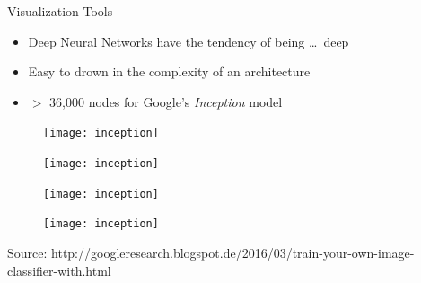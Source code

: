 \begin{slide}{Visualization Tools}
  \begin{itemize}
    \item<2-> Deep Neural Networks have the tendency of being \dots\, deep
    \item<3-> Easy to drown in the complexity of an architecture
    \item<4-> $>$ 36,000 nodes for Google's \emph{Inception} model
  \end{itemize}
\end{slide}

\begin{frame}
  \begin{figure}
     \advance\leftskip-2.2cm
    \texttt{[image: inception]}
  \end{figure}
\end{frame}

\begin{frame}
  \begin{figure}
    \advance\leftskip-2.2cm
    \texttt{[image: inception]}
  \end{figure}
\end{frame}

\begin{frame}
  \begin{figure}
    \advance\leftskip-2.2cm
    \texttt{[image: inception]}
  \end{figure}
\end{frame}

\begin{frame}
  \begin{figure}
    \advance\leftskip-2.2cm
    \texttt{[image: inception]}

  \end{figure}
  {\tiny Source: http://googleresearch.blogspot.de/2016/03/train-your-own-image-classifier-with.html}
\end{frame}



